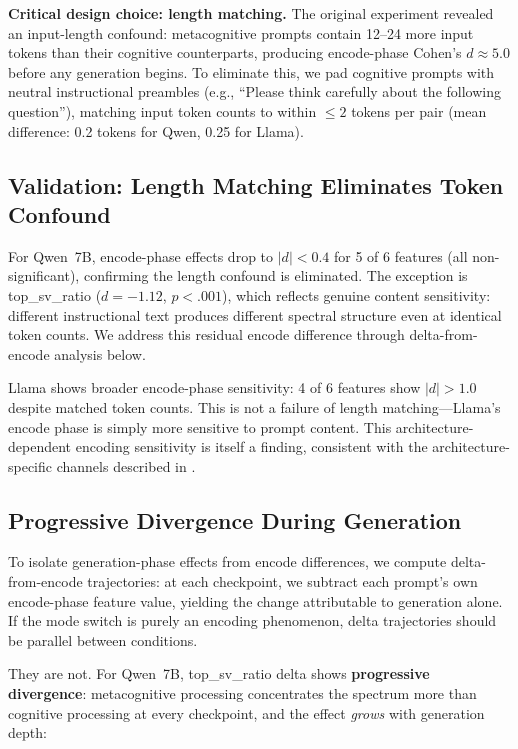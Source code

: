 \documentclass[11pt,a4paper]{article}
\begin{document}
\textbf{Critical design choice: length matching.} The original experiment revealed an input-length confound: metacognitive prompts contain 12--24 more input tokens than their cognitive counterparts, producing encode-phase Cohen's $d \approx 5.0$ before any generation begins. To eliminate this, we pad cognitive prompts with neutral instructional preambles (e.g., ``Please think carefully about the following question''), matching input token counts to within $\leq 2$ tokens per pair (mean difference: 0.2 tokens for Qwen, 0.25 for Llama).

\subsection{Validation: Length Matching Eliminates Token Confound}

For Qwen~7B, encode-phase effects drop to $|d| < 0.4$ for 5 of 6 features (all non-significant), confirming the length confound is eliminated. The exception is top\_sv\_ratio ($d = -1.12$, $p < .001$), which reflects genuine content sensitivity: different instructional text produces different spectral structure even at identical token counts. We address this residual encode difference through delta-from-encode analysis below.

Llama shows broader encode-phase sensitivity: 4 of 6 features show $|d| > 1.0$ despite matched token counts. This is not a failure of length matching---Llama's encode phase is simply more sensitive to prompt content. This architecture-dependent encoding sensitivity is itself a finding, consistent with the architecture-specific channels described in .

\subsection{Progressive Divergence During Generation}

To isolate generation-phase effects from encode differences, we compute delta-from-encode trajectories: at each checkpoint, we subtract each prompt's own encode-phase feature value, yielding the change attributable to generation alone. If the mode switch is purely an encoding phenomenon, delta trajectories should be parallel between conditions.

They are not. For Qwen~7B, top\_sv\_ratio delta shows \textbf{progressive divergence}: metacognitive processing concentrates the spectrum more than cognitive processing at every checkpoint, and the effect \emph{grows} with generation depth:
\end{document}

